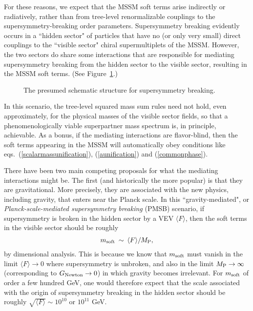 \documentclass[12pt]{article}
\def\beq{\begin{eqnarray}}
\def\eeq{\end{eqnarray}}
\def\MPlanck{M_{\rm P}}
\begin{document}
For these reasons, we expect that the MSSM soft terms arise indirectly or
radiatively, rather than from tree-level renormalizable couplings to the
supersymmetry-breaking order parameters. Supersymmetry breaking evidently
occurs in a ``hidden sector" of particles that have no (or only very
small) direct couplings to the ``visible sector" chiral supermultiplets of
the MSSM. However, the two sectors do share some interactions that are
responsible for mediating supersymmetry breaking from the hidden sector to
the visible sector, resulting in the MSSM soft terms.
(See Figure~\ref{fig:structure}.)%
\begin{figure}
\centerline{}
\caption{The presumed schematic structure for supersymmetry breaking.
\label{fig:structure}}
\end{figure}
%
In this scenario, the tree-level squared 
mass sum rules need not hold, even approximately, for the physical masses 
of the visible sector fields, so that a phenomenologically viable 
superpartner mass spectrum is, in principle, achievable. As a bonus, if 
the mediating interactions are flavor-blind, then the soft terms appearing 
in the MSSM will automatically obey conditions like 
eqs.~(\ref{scalarmassunification}), (\ref{aunification}) and 
(\ref{commonphase}).

There have been two main competing proposals for what the mediating
interactions might be. The first (and historically the more popular) is
that they are gravitational. More precisely, they are associated with the
new physics, including gravity, that enters near the Planck scale. In this
``gravity-mediated", or {\it Planck-scale-mediated supersymmetry breaking}
(PMSB) scenario, if supersymmetry is broken in the hidden sector by a VEV
$\langle F\rangle$, then the soft terms in the visible sector should be
roughly
\beq
m_{\rm soft} \>\sim\> {\langle F \rangle / \MPlanck},
\label{mgravusual}
\eeq
by dimensional analysis. This is because we know that $m_{\rm soft}$ must
vanish in the limit $\langle F \rangle \rightarrow 0$ where supersymmetry
is unbroken, and also in the limit $\MPlanck \rightarrow \infty$
(corresponding to $G_{\rm Newton} \rightarrow 0$) in which gravity becomes
irrelevant. For $m_{\rm soft}$ of order a few hundred GeV, one would
therefore expect that the scale associated with the origin of
supersymmetry breaking in the hidden sector should be roughly
${\sqrt{\langle F\rangle}} \sim 10^{10}$ or $10^{11}$ GeV. 
\end{document}
